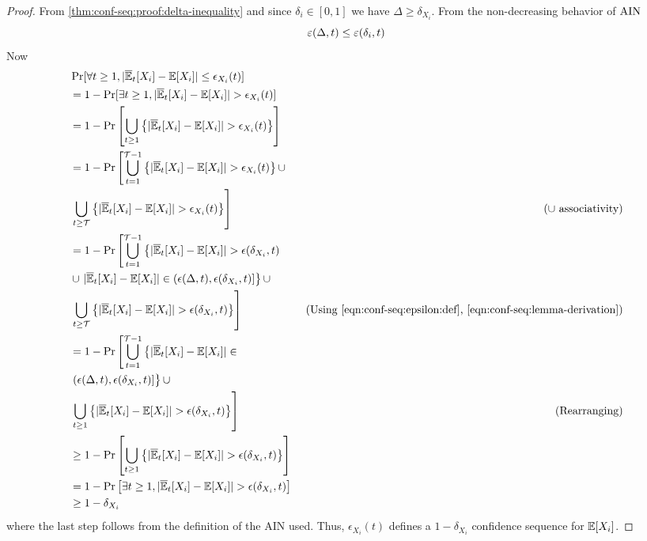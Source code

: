 \begin{proof}
From \eqref{thm:conf-seq:proof:delta-inequality} and since $\delta_i \in [0, 1]$ we have $\Delta \geq \delta_{X_i}$. 
From the non-decreasing behavior of $\rm{AIN}$
\begin{equation}
    \varepsilon(\Delta, t) \leq \varepsilon(\delta_i, t)
    \label{eqn:conf-seq:lemma-derivation}
\end{equation}
Now
{\allowdisplaybreaks
\begin{align*}
    &\Pr[\forall t \geq 1, |\BarE_t[X_i] - \E[X_i]| \leq \epsilon_{X_i}(t)] \\
    &                       = 1 -  \Pr[\exists t \geq 1, |\BarE_t[X_i] - \E[X_i]| > \epsilon_{X_i}(t)] \\
    &                       = 1 - \Pr\left[\bigcup\limits_{t \geq 1} \left\{|\BarE_t[X_i] - \E[X_i]| > \epsilon_{X_i}(t)\right\}\right] \\
    &                       = 1 - \Pr\left[\bigcup\limits_{t = 1}^{\gT-1} \left\{|\BarE_t[X_i] - \E[X_i]| > \epsilon_{X_i}(t)\right\} \cup \right. \\
    &                        \left. \bigcup\limits_{t \geq \gT} \left\{|\BarE_t[X_i] - \E[X_i]| > \epsilon_{X_i}(t)\right\} \right] & \text{($\cup$ associativity)} \\
    &                       = 1 - \Pr\left[\bigcup\limits_{t = 1}^{\gT-1} \left\{|\BarE_t[X_i] - \E[X_i]| > \epsilon(\delta_{X_i}, t) \right. \right.\\
    &                        \cup \left. |\BarE_t[X_i] - \E[X_i]| \in (\epsilon(\Delta, t), \epsilon(\delta_{X_i}, t)] \right\} \cup \\ 
    &                       \left. \bigcup\limits_{t \geq \gT} \left\{|\BarE_t[X_i] - \E[X_i]| > \epsilon(\delta_{X_i}, t)\right\} \right]  &\text{ (Using \ref{eqn:conf-seq:epsilon:def}, \ref{eqn:conf-seq:lemma-derivation})} \\
    &                       = 1 - \Pr\left[\bigcup\limits_{t = 1}^{\gT-1} \left\{ |\BarE_t[X_i] - \E[X_i]|  \in \right. \right. \\
    &                  \left. \vphantom{\BarE_t[X_i]} (\epsilon(\Delta, t), \epsilon(\delta_{X_i}, t)] \right\} \cup \\
    &                        \left. \bigcup\limits_{t \geq 1} \left\{|\BarE_t[X_i] - \E[X_i]| > \epsilon(\delta_{X_i}, t)\right\} \right] &\text{(Rearranging)}\\
    &                       \geq 1 - \Pr\left[\bigcup\limits_{t \geq 1} \left\{|\BarE_t[X_i] - \E[X_i]| > \epsilon(\delta_{X_i}, t)\right\} \right] \\
    &                       = 1 - \Pr\left[ \exists t \geq 1, |\BarE_t[X_i] - \E[X_i]| > \epsilon(\delta_{X_i}, t) \right] \\
    &                       \geq 1 - \delta_{X_i}
\end{align*}
}
where the last step follows from the definition of the AIN used.
Thus, $\epsilon_{X_i}(t)$ defines a $1 - \delta_{X_i}$ confidence sequence for $\mathbb{E}[X_i]$.


\end{proof}

